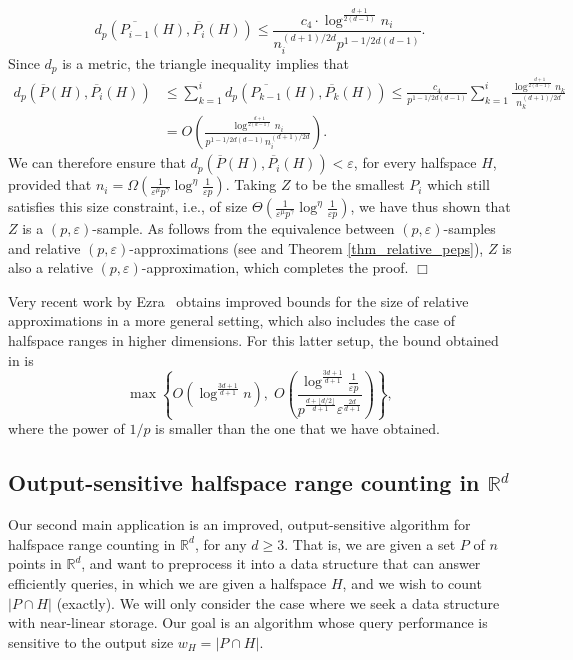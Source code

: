 \documentclass[11pt]{article}
\def\reals{\mathbb R}
\def\eps{\varepsilon}
\def\meas#1#2{\overline{#1}(#2)}
\begin{document}
$$
d_{p}(\meas{P_{i-1}}{H}, \meas{P_{i}}{H}) \leq \frac{c_{4} \cdot \log^{\frac{d+1}{2(d-1)}} n_{i}}{n_{i}^{(d+1)/2d} p^{1-1/2d(d-1)}}.
$$
Since $d_{p}$ is a metric, the triangle inequality implies that
\begin{align*}
d_{p}(\meas{P}{H}, \meas{P_{i}}{H}) &\leq \sum_{k=1}^{i}d_{p}(\meas{P_{k-1}}{H}, \meas{P_{k}}{H}) \leq \frac{c_{4}}{p^{1-1/2d(d-1)}}\sum_{k=1}^{i}\frac{\log^{\frac{d+1}{2(d-1)}} n_{k}}{n_{k}^{(d+1)/2d}} \\
&= O\left(\frac{\log^{\frac{d+1}{2(d-1)}}n_{i}}{p^{1-1/2d(d-1)} n_{i}^{(d+1)/2d}}\right).
\end{align*}
We can therefore ensure that $d_{p}(\meas{P}{H}, \meas{P_{i}}{H}) < \eps$, for every halfspace $H$, provided that
$n_{i} = \Omega\left(\frac{1}{\eps^{\mu} p^{\gamma}} \log^{\eta}\frac{1}{\eps p}\right)$. Taking $Z$ to be the smallest $P_{i}$ which still satisfies this size constraint, i.e., of size  $\Theta\left(\frac{1}{\eps^{\mu} p^{\gamma}} \log^{\eta}\frac{1}{\eps p}\right)$, we have thus shown that $Z$ is a $(p,\eps)$-sample. As follows from the equivalence between $(p,\eps)$-samples and relative $(p,\eps)$-approximations (see \cite{hs11} and Theorem \ref{thm_relative_peps}), $Z$ is also a relative $(p,\eps)$-approximation, which completes the proof. $\Box$

Very recent work by Ezra~\cite{ez14} obtains improved bounds for the
size of relative approximations in a more general setting, which also
includes the case of halfspace ranges in higher dimensions.
For this latter setup, the bound obtained in \cite{ez14} is
$$
\max \left\{ O\left(\log^{\frac{3d+1}{d+1}} n \right) , \;
O\left(\frac{ \log^{\frac{3d+1}{d+1}} \frac{1}{\eps p}}
{ p^{\frac{d+\lfloor d/2 \rfloor}{d+1}} \eps^{\frac{2d}{d+1}} }
\right) \right\} ,
$$
where the power of $1/p$ is smaller than the one that we have obtained.



\subsection{Output-sensitive halfspace range counting in $\reals^d$} \label{subsection_range_countning}

Our second main application is an improved, output-sensitive algorithm for halfspace range counting in $\reals^{d}$, for any $d \geq 3$. That is, we are given a set $P$ of $n$ points in $\reals^{d}$, and want to preprocess it into a data structure that can answer efficiently queries, in which we are given a halfspace $H$, and we wish to count $|P \cap H|$ (exactly). We will only consider the case where we seek a data structure with near-linear storage. Our goal is an algorithm whose query performance is sensitive to the output size $w_{H} = |P \cap H|$.
\end{document}

